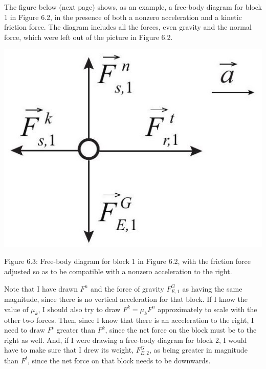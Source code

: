 \documentclass[10pt]{article}
\begin{document}
The figure below (next page) shows, as an example, a free-body diagram for block 1 in Figure 6.2, in the presence of both a nonzero acceleration and a kinetic friction force. The diagram includes all the forces, even gravity and the normal force, which were left out of the picture in Figure 6.2.

\begin{center}
\includegraphics[max width=\textwidth]{2024_09_14_9969b06773f10b6936e8g-145}
\end{center}

Figure 6.3: Free-body diagram for block 1 in Figure 6.2, with the friction force adjusted so as to be compatible with a nonzero acceleration to the right.

Note that I have drawn $F^{n}$ and the force of gravity $F_{E, 1}^{G}$ as having the same magnitude, since there is no vertical acceleration for that block. If I know the value of $\mu_{k}$, I should also try to draw $F^{k}=\mu_{k} F^{n}$ approximately to scale with the other two forces. Then, since I know that there is an acceleration to the right, I need to draw $F^{t}$ greater than $F^{k}$, since the net force on the block must be to the right as well. And, if I were drawing a free-body diagram for block 2, I would have to make sure that I drew its weight, $F_{E, 2}^{G}$, as being greater in magnitude than $F^{t}$, since the net force on that block needs to be downwards.
\end{document}
